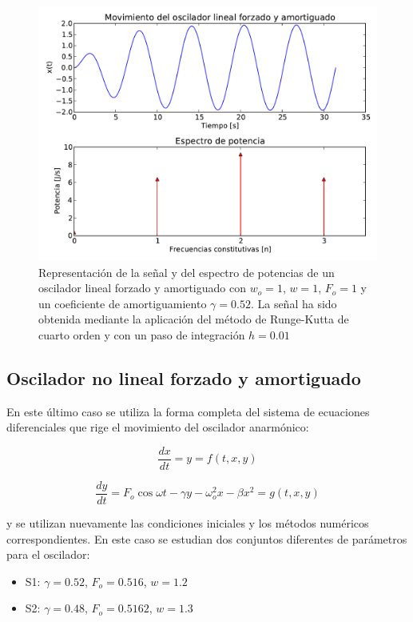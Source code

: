 \documentclass[11pt]{article}
\begin{document}
\begin{figure}
\centering
\includegraphics[width=0.75\linewidth]{caso_forzado_amortiguado.pdf}
\caption{Representación de la señal y del espectro de potencias de un oscilador
lineal forzado y amortiguado con $w_o = 1$, $w = 1$, $F_o = 1$ y un coeficiente
de amortiguamiento $\gamma = 0.52$. La señal ha sido obtenida mediante la
aplicación del método de Runge-Kutta de cuarto orden y con un paso de
integración $h = 0.01$}
\label{fig:caso_forzado_amortiguado}
\end{figure}

\subsection{Oscilador no lineal forzado y amortiguado}
En este último caso se utiliza la forma completa del sistema de ecuaciones
diferenciales que rige el movimiento del oscilador anarmónico:

\begin{equation}
	\frac{dx}{dt} = y = f(t, x, y)
\end{equation}

\begin{equation}
	\frac{dy}{dt} = F_{o}\cos{\omega{}t} -\gamma{}y - \omega_{o}^2x
	- \beta{}x^2 = g(t, x, y) 	
\end{equation}

y se utilizan nuevamente las condiciones iniciales y los métodos numéricos
correspondientes. En este caso se estudian dos conjuntos diferentes de
parámetros para el oscilador:

\begin{itemize}
	\item S1: $\gamma = 0.52$, $F_o = 0.516$, $w = 1.2$
	\item S2: $\gamma = 0.48$, $F_o = 0.5162$, $w = 1.3$
\end{itemize}
\end{document}
